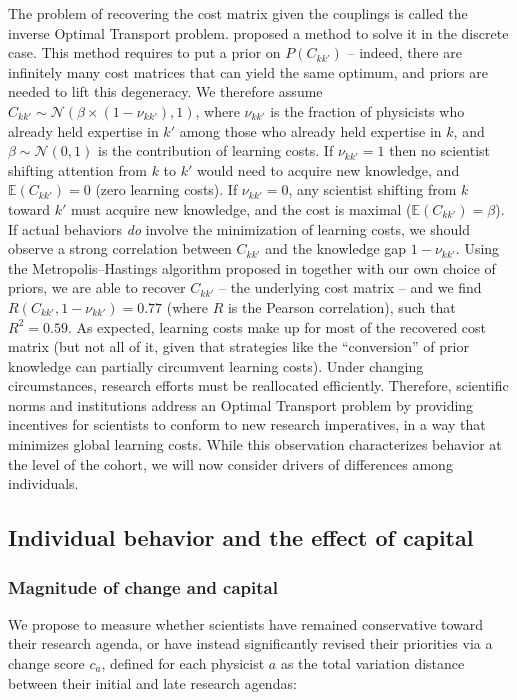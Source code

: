 \documentclass{article}
\begin{document}
The problem of recovering the cost matrix given the couplings is called the inverse Optimal Transport problem. \citet{Chu2021} proposed a method to solve it in the discrete case. This method requires to put a prior on $P(C_{kk'})$ -- indeed, there are infinitely many cost matrices that can yield the same optimum, and priors are needed to lift this degeneracy. We therefore assume $C_{kk'}\sim \mathcal{N}(\beta \times (1-\nu_{kk'}),1)$, where $\nu_{kk'}$ is the fraction of physicists who already held expertise in $k'$ among those who already held expertise in $k$, and $\beta\sim\mathcal{N}(0,1)$ is the contribution of learning costs. If $\nu_{kk'}=1$ then no scientist shifting attention from $k$ to $k'$ would need to acquire new knowledge, and $\mathbb{E}(C_{kk'})=0$ (zero learning costs). If $\nu_{kk'}=0$, any scientist shifting from $k$ toward $k'$ must acquire new knowledge, and the cost is maximal ($\mathbb{E}(C_{kk'})=\beta$). If actual behaviors \textit{do} involve the minimization of learning costs, we should observe a strong correlation between $C_{kk'}$ and the knowledge gap $1-\nu_{kk'}$.  Using the Metropolis–Hastings algorithm proposed in \citealt{Chu2021} together with our own choice of priors, we are able to recover $C_{kk'}$ -- the underlying cost matrix -- and we find $R(C_{kk'},1-\nu_{kk'})=0.77$ (where $R$ is the Pearson correlation), such that $R^2=0.59$. As expected, learning costs make up for most of the recovered cost matrix (but 
 not all of it, given that strategies like the ``conversion'' of prior knowledge can partially circumvent learning costs). Under changing circumstances, research efforts must be reallocated efficiently. Therefore, scientific norms and institutions address an Optimal Transport problem by providing incentives for scientists to conform to new research imperatives, in a way that minimizes global learning costs. While this observation characterizes behavior at the level of the cohort, we will now consider drivers of differences among individuals. 

\subsection{\label{sec:magnitude}Individual behavior and the effect of capital}

\subsubsection{Magnitude of change and capital}

We propose to measure whether scientists have remained conservative toward their research agenda, or have instead significantly revised their priorities via a change score $c_a$, defined for each physicist $a$ as the total variation distance between their initial and late research agendas:
\end{document}
